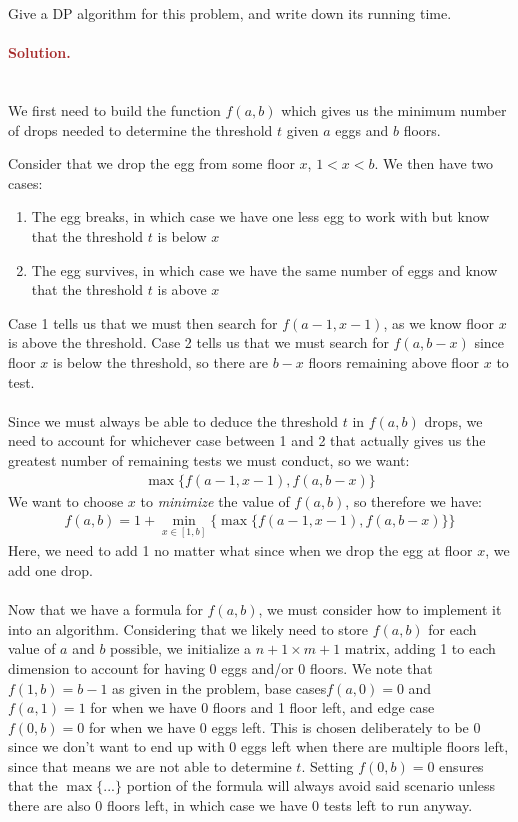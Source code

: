 Give a DP algorithm for this problem, and write down its running time.

\paragraph{\textcolor{brown}{Solution.}} \: \\
We first need to build the function $f(a, b)$ which gives us the minimum number of drops needed to determine the threshold $t$ given $a$ eggs and $b$ floors. 

Consider that we drop the egg from some floor $x$, $1<x<b$. We then have two cases: 
\begin{enumerate}
    \item The egg breaks, in which case we have one less egg to work with but know that the threshold $t$ is below $x$
    \item The egg survives, in which case we have the same number of eggs and know that the threshold $t$ is above $x$
\end{enumerate} 
Case 1 tells us that we must then search for $f(a-1, x-1)$, as we know floor $x$ is above the threshold. Case 2 tells us that we must search for $f(a, b-x)$ since floor $x$ is below the threshold, so there are $b-x$ floors remaining above floor $x$ to test.
\\ \\ Since we must always be able to deduce the threshold $t$ in $f(a, b)$ drops, we need to account for whichever case between 1 and 2 that actually gives us the greatest number of remaining tests we must conduct, so we want: 
\begin{gather*}
    \max\{f(a-1, x-1), f(a, b-x)\}
\end{gather*}
We want to choose $x$ to \textit{minimize} the value of $f(a, b)$, so therefore we have: 
\begin{gather*}
    f(a,b) = 1 + \underset{x \in [1, b]}{\min}\{\max\{f(a-1, x-1), f(a, b-x)\}\}
\end{gather*}
Here, we need to add 1 no matter what since when we drop the egg at floor $x$, we add one drop. 
\\ \\ Now that we have a formula for $f(a, b)$, we must consider how to implement it into an algorithm. Considering that we likely need to store $f(a, b)$ for each value of $a$ and $b$ possible, we initialize a $n+1 \times m+1$ matrix, adding 1 to each dimension to account for having 0 eggs and/or 0 floors. We note that $f(1, b)=b-1$ as given in the problem, base cases$f(a, 0)=0$ and $f(a, 1)=1$ for when we have 0 floors and 1 floor left, and edge case $f(0, b)=0$ for when we have 0 eggs left. This is chosen deliberately to be 0 since we don't want to end up with 0 eggs left when there are multiple floors left, since that means we are not able to determine $t$. Setting $f(0, b)=0$ ensures that the $\max\{...\}$ portion of the formula will always avoid said scenario unless there are also 0 floors left, in which case we have 0 tests left to run anyway.
